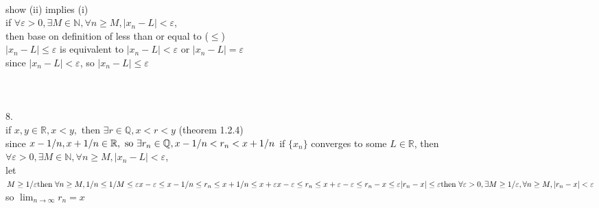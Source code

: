 \documentclass[12pt, border = 4pt, multi]{article} %
\begin{document}
\\
show (ii) implies (i)\\
if $\forall \varepsilon > 0, \exists M \in \mathbb{N}, \forall n \geq M, |x_n - L| < \varepsilon$,\\
then base on definition of less than or equal to ($\leq$)\\
$|x_n - L| \leq \varepsilon$ is equivalent to $|x_n - L| < \varepsilon$ or $|x_n - L| = \varepsilon$\\
since $|x_n - L| < \varepsilon$, so $|x_n - L| \leq \varepsilon$\\
\\
\\
\\
8.\\
if $x, y \in \mathbb{R}, x < y, \text{ then } \exists r \in \mathbb{Q}, x < r < y$ \qquad (theorem 1.2.4)\\
since $x - 1 / n, x + 1 / n \in \mathbb{R}, \text{ so } \exists r_n \in \mathbb{Q}, x - 1 / n < r_n < x + 1 / n\\$
if $\{x_n\}$ converges to some $L \in \mathbb{R}$, then $\forall \varepsilon > 0, \exists M \in \mathbb{N}, \forall n \geq M, |x_n - L| < \varepsilon$,\\
let $M \geq 1 / \varepsilon\\
\text{then } \forall n \geq M, 1 / n \leq 1 / M \leq \varepsilon\\
x - \varepsilon \leq x - 1 / n \leq r_n \leq x + 1 / n \leq x + \varepsilon\\
x - \varepsilon \leq r_n \leq x + \varepsilon\\
-\varepsilon \leq r_n - x \leq \varepsilon\\
|r_n - x| \leq \varepsilon\\
\text{then }\forall \varepsilon > 0, \exists M \geq 1 / \varepsilon, \forall n \geq M, |r_n - x| < \varepsilon$\\
so $\lim_{n \rightarrow \infty} r_n = x$\\
\end{document}
